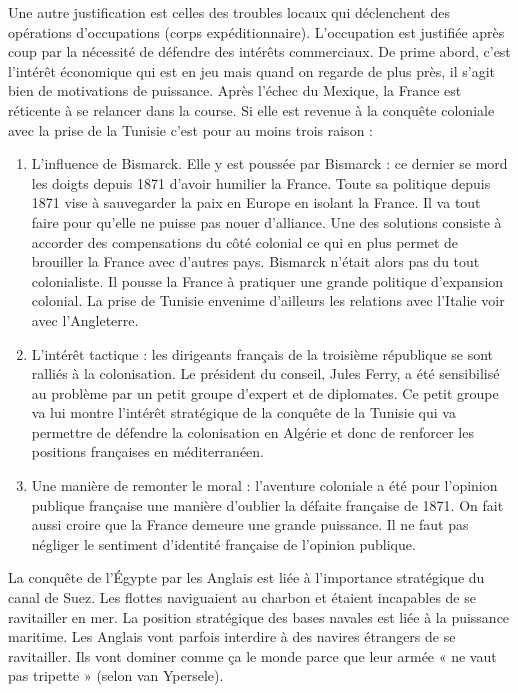 \documentclass[12pt]{report}
\begin{document}
Une autre justification est celles des troubles locaux qui déclenchent des opérations
d’occupations (corps expéditionnaire). L’occupation est justifiée après coup par la nécessité
de défendre des intérêts commerciaux. De prime abord, c’est l’intérêt économique qui est en
jeu mais quand on regarde de plus près, il s’agit bien de motivations de puissance. Après
l’échec du Mexique, la France est réticente à se relancer dans la course. Si elle est revenue à
la conquête coloniale avec la prise de la Tunisie c’est pour au moins trois raison :

\begin{enumerate}
\item L’influence de Bismarck. Elle y est poussée par Bismarck : ce dernier se mord les
doigts depuis 1871 d’avoir humilier la France. Toute sa politique depuis 1871 vise à
sauvegarder la paix en Europe en isolant la France. Il va tout faire pour qu’elle ne
puisse pas nouer d’alliance. Une des solutions consiste à accorder des compensations
du côté colonial ce qui en plus permet de brouiller la France avec d’autres pays.
Bismarck n’était alors pas du tout colonialiste. Il pousse la France à pratiquer une
grande politique d’expansion colonial. La prise de Tunisie envenime d’ailleurs les
relations avec l’Italie voir avec l’Angleterre.
\item L’intérêt tactique : les dirigeants français de la troisième république se sont ralliés à la
colonisation. Le président du conseil, Jules Ferry, a été sensibilisé au problème par un
petit groupe d’expert et de diplomates. Ce petit groupe va lui montre l’intérêt
stratégique de la conquête de la Tunisie qui va permettre de défendre la colonisation
en Algérie et donc de renforcer les positions françaises en méditerranéen.
\item Une manière de remonter le moral : l’aventure coloniale a été pour l’opinion publique
française une manière d’oublier la défaite française de 1871. On fait aussi croire que la
France demeure une grande puissance. Il ne faut pas négliger le sentiment d’identité
française de l’opinion publique.
\end{enumerate}

La conquête de l’Égypte par les Anglais est liée à l’importance stratégique du canal de Suez.
Les flottes naviguaient au charbon et étaient incapables de se ravitailler en mer. La position
stratégique des bases navales est liée à la puissance maritime. Les Anglais vont parfois
interdire à des navires étrangers de se ravitailler. Ils vont dominer comme ça le monde parce
que leur armée « ne vaut pas tripette » (selon van Ypersele).
\end{document}
